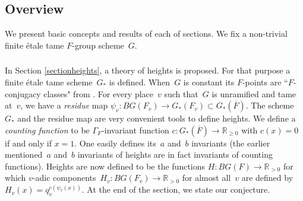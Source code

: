 \documentclass[a4paper,english,12pt]{amsart}
\newcommand{\QQ}{\mathbb{Q}}
\newcommand{\RR}{\mathbb{R}}
\newcommand{\oF}{\overline F}
\newcommand{\Fv}{F_v}
\numberwithin{equation}{subsection}
\begin{document}
\subsection{Overview}We present basic concepts and results of each of sections. We fix a non-trivial finite \' etale tame $F$-group scheme~$G$. 
\subsubsection{} In Section \ref{sectionheights}, a theory of heights is proposed. For that purpose a finite \' etale tame scheme~$G_*$ is defined. When~$G$ is constant its $F$-points are ``$F$-conjugacy classes" from \cite{Malle}. For every place~$v$ such that~$G$ is unramified and tame at~$v$, we have a {\it residue} map $\psi_v:BG(F_v)\to G_*(\Fv)\subset G_*(\oF)$. The scheme $G_*$ and the residue map are very convenient tools to define heights. We define a {\it counting function} to be $\Gamma_F$-invariant function $c: G_*(\oF)\to\RR_{\geq 0}$ with $c(x)=0$ if and only if $x=1$. One easily defines its~$a$ and~$b$ invariants (the earlier mentioned~$a$ and~$b$ invariants of heights are in fact invariants of counting functions). Heights are now defined to be the functions $H:BG(F)\to\RR_{>0}$ for which $v$-adic components~$H_v:BG(F_v)\to\RR_{>0}$ for almost all~$v$ are defined by $H_v(x)=q_v^{c(\psi_v(x))}$. At the end of the section, we state our conjecture. 
\end{document}

